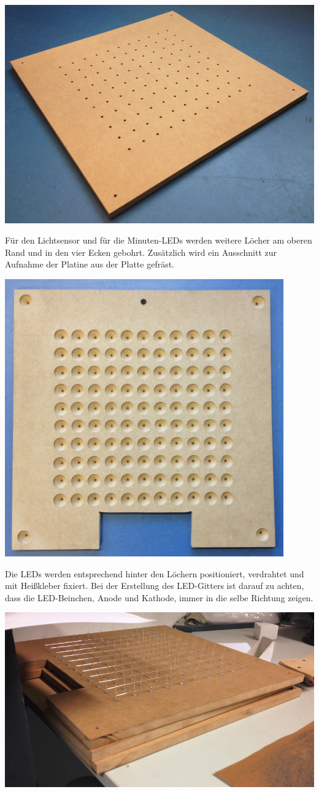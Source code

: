 \begin{multicols}{2}
{
\centering\includegraphics[width=0.8\columnwidth]{Abbildungen/Konstruktion/Platte02}

}
Für den Lichtsensor und für die Minuten-LEDs werden weitere Löcher am oberen Rand und in den vier Ecken gebohrt. Zusätzlich wird ein Ausschnitt zur Aufnahme der Platine aus der Platte gefräst. 

{
\centering\includegraphics[width=0.85\columnwidth]{Abbildungen/Konstruktion/Platte03}

}
Die LEDs werden entsprechend hinter den Löchern positioniert, verdrahtet und mit Heißkleber fixiert. Bei der Erstellung des LED-Gitters ist darauf zu achten, dass die LED-Beinchen, Anode und Kathode, immer in die selbe Richtung zeigen. 

{
\centering\includegraphics[width=0.85\columnwidth]{Abbildungen/Konstruktion/LED01}

}
\end{multicols}
